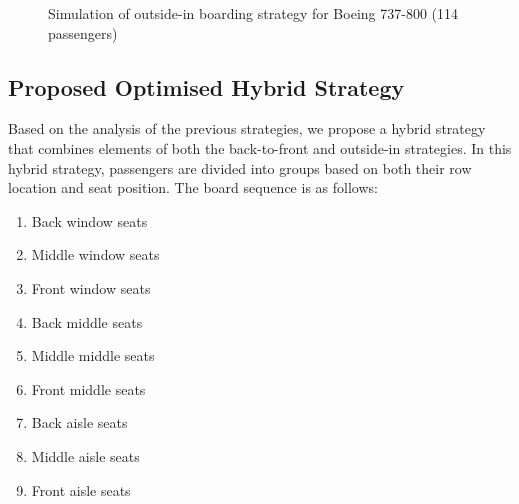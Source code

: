 \documentclass[12pt]{article}
\begin{document}
\begin{figure}[H]
\centering
{}
\caption{Simulation of outside-in boarding strategy for Boeing 737-800 (114 passengers)}
\end{figure}

\subsection{Proposed Optimised Hybrid Strategy}

Based on the analysis of the previous strategies, we propose a hybrid strategy that combines elements of both the back-to-front and outside-in strategies. In this hybrid strategy, passengers are divided into groups based on both their row location and seat position. The board sequence is as follows:

\begin{enumerate}
    \item Back window seats
    \item Middle window seats
    \item Front window seats
    \item Back middle seats
    \item Middle middle seats
    \item Front middle seats
    \item Back aisle seats
    \item Middle aisle seats
    \item Front aisle seats
\end{enumerate}
\end{document}
